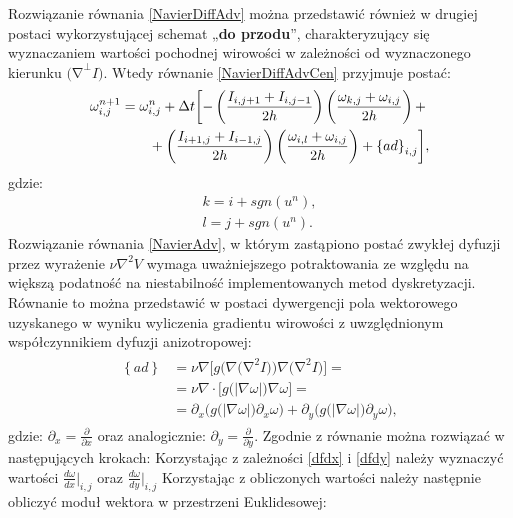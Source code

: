 \documentclass[12pt, twoside, openany]{report}
\theoremstyle{definition}
\begin{document}
Rozwiązanie równania \eqref{NavierDiffAdv} można przedstawić również w drugiej postaci wykorzystującej schemat „\textbf{do przodu}”, charakteryzujący się wyznaczaniem wartości pochodnej wirowości w zależności od wyznaczonego kierunku ${\mathrm{(}\mathrm{\nabla }}^{\bot }I)$.  Wtedy równanie \eqref{NavierDiffAdvCen} przyjmuje postać:
\begin{align}
\fontsize{11} \omega
\omega^{n+1}_{i,j} &= {\omega }^n_{i,j}+\Delta t\biggl[
-\left(\frac{I_{i,j+1}+I_{i,j-1}}{2h}\right)\left(\frac{{\omega }_{k,j}+{\omega }_{i,j}}{2h}\right)+ \notag\\ 
&\qquad+ \left(\frac{I_{i+1,j}+I_{i-1,j}}{2h}\right)\left(\frac{{\omega }_{i,l}+{\omega }_{i,j}}{2h}\right)+{\left\{ad\right\}}_{i,j} \biggr],
\label{NavierDiffAdvFor}
\end{align}
gdzie:
\begin{align}
k = i+sgn\left(u^n\right), \\
l = j+sgn(u^n).
\end{align}
Rozwiązanie równania \eqref{NavierAdv}, w którym zastąpiono postać zwykłej dyfuzji przez wyrażenie $\nu {\nabla }^2V$ wymaga uważniejszego potraktowania ze względu na większą podatność na niestabilność implementowanych metod dyskretyzacji. Równanie to można przedstawić w postaci dywergencji pola wektorowego uzyskanego w wyniku wyliczenia gradientu wirowości z uwzględnionym współczynnikiem dyfuzji anizotropowej:
\begin{align}
\begin{aligned}
\left\{ad\right\} 
&= \nu \nabla\Big[g\Big(\nabla {(\mathrm{\nabla }}^2I)\Big)\nabla {\mathrm{(}\mathrm{\nabla }}^2I)\Big]= \\[1ex]
&= \nu \nabla \cdot \Big[g\big(|\nabla \omega|\big)\nabla \omega \Big]=\\[1ex]
&= \partial _x \Big(g\big(\left|\nabla \omega \right|\big){\partial }_x\omega \Big)+ \partial_y \Big(g\big(\left|\nabla \omega \right|\big){\partial }_y\omega \Big),
\end{aligned}
\label{Anisotropic}
\end{align}
gdzie: ${\partial }_x=\frac{\partial }{\partial x}$ oraz analogicznie: ${\partial }_y=\frac{\partial }{\partial y}$.
Zgodnie z \cite{ebrahimi2012navier} równanie można rozwiązać w następujących krokach:
Korzystając z zależności \eqref{dfdx} i \eqref{dfdy} należy wyznaczyć wartości ${\frac{d\omega }{dx}}\big|_{i,j}$ oraz ${\frac{d\omega }{dy}}\big|_{i,j}$
Korzystając z obliczonych wartości należy następnie obliczyć moduł wektora w przestrzeni Euklidesowej:
\end{document}
